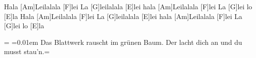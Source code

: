 

\begin{guitar}
	\begin{highlightbar}
		Hala [Am]Leilalala [F]lei La [G]leilalala [E]lei hala [Am]Leilalala [F]lei La [G]lei lo [E]la
		Hala [Am]Leilalala [F]lei La [G]leilalala [E]lei hala [Am]Leilalala [F]lei La [G]lei lo [E]la
	\end{highlightbar}
	
	\hfill%
\end{guitar}

\newdimen\origiwstr%
\origiwstr=\font%
\font=0.01em Das Blattwerk rauscht im grünen Baum. Der lacht dich an und du musst stau'n.\font=\origiwstr

